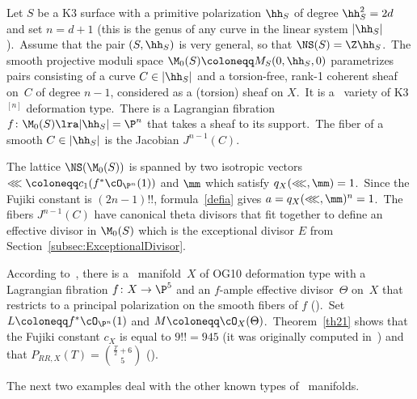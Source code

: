 \begin{exam}
\notready\label{ex:K3n}
Let $S$ be a K3 surface with a primitive polarization $\hh_S$ of degree $\hh_S^2=2d$ and set $n=d+1$ (this is the genus of any curve in the linear system $ |\hh_S|$).\
Assume that the pair $(S,\hh_S)$ is very general, so that $\NS(S)=\Z \hh_S$.\
The smooth projective moduli space  $\M_0(S)\coloneqq M_{S}(0,\hh_S,0)$ parametrizes pairs consisting of a curve $C\in|\hh_S|$ and a torsion-free, rank-1 coherent sheaf on~$C$ of degree $n-1$, considered as a (torsion) sheaf on $X$.\
It is a \hk\ variety of K3$^{[n]}$ deformation type.\
There is a Lagrangian fibration
$
f\colon \M_0(S)\lra |\hh_S|=\P^{n}
$
that takes a sheaf to its support.\
The fiber of a smooth $C\in  |\hh_S|$ is the Jacobian $J^{n-1}(C)$.

The lattice $\NS(\M_0(S))$   is spanned by two isotropic vectors
$\lll\coloneqq c_1(f^*\cO_{\P^{n}}(1))$ and $  \mm$
 which satisfy $ q_X(\lll, \mm)=1$.\  Since the Fujiki constant is $ (2n-1)!!$, formula~\eqref{defia} gives $a = q_X(\lll, \mm)^n=1$.\  The fibers $J^{n-1}(C)$ have canonical theta divisors that fit together to define an effective divisor in $\M_0(S)$ which is the exceptional divisor $E$ from Section~\ref{subsec:ExceptionalDivisor}.
\end{exam}

\begin{exam}[R\'ios Ortiz]
\notready\label{ex:OG10}
According to~\cite{lsv}, there is a \hk\ manifold~$X$ of OG10 deformation type with a Lagrangian fibration \mbox{$f\colon X\to \P^5$} and an $f$-ample effective divisor~$\Theta$ on~$X$ that restricts to a principal polarization on the smooth fibers of $f$ (\cite[Proposition~5.3]{lsv}).\
Set $L\coloneqq f^*\cO_{\P^n}(1)$ and $M\coloneqq\cO_X(\Theta)$.\
Theorem~\ref{th21} shows that the Fujiki constant $c_X$ is equal to $9!!=945$ (it was originally computed in~\cite{rap}) and that
$
P_{RR,X}(T)= \binom{ \frac{T }{2  }+6}{5}$ (\cite{ort}).
\end{exam}

The next two examples deal with the other   known types of  \hk\ manifolds.

